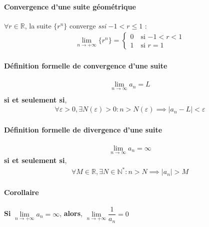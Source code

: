 \documentclass[2pt]{report}
\begin{document}
\begin{multicols*}{3}
        \paragraph{Convergence d'une suite géométrique}
        $\forall r \in \mathbb{R}$, la suite $\{r^n\}$ converge        
        \textit{ssi} $-1 < r \leq 1$ : 
        \begin{align*}
            \lim\limits_{n\to+\infty }\{r^n\} = 
                    \begin{cases}
                        0 \quad \text{si $-1 < r < 1$} \\
                        1 \quad \text{si $r = 1$}
                    \end{cases}
        \end{align*}


        

    \paragraph{Définition formelle de convergence d'une suite}
      \begin{align*}
        \lim\limits_{n \to\infty  }{a_n} = L \\
      \end{align*}
      \textbf{si et seulement si}, 
      \begin{align*}
        \forall\varepsilon > 0, \exists N\left( \varepsilon \right) > 0 : 
        n > N\left( \varepsilon \right) \implies 
        |a_n -L| < \varepsilon
      \end{align*}



    \paragraph{Définition formelle de divergence d'une suite}
      \begin{align*}
        \lim\limits_{n  \to\infty  }{a_n} = \infty
      \end{align*}
      \textbf{si et seulement si},  
        \begin{align*}
            \forall M \in \mathbb{R}, \exists N \in \mathbb{N}^{*} :
            n > N \implies |a_n| > M 
        \end{align*}

    \paragraph{Corollaire}
    \textbf{Si} $\lim\limits_{n\to+\infty }a_n  = \infty$, 
    \textbf{alors}, 
    $\lim\limits_{n\to+\infty }{\dfrac{1}{a_n}}  = 0$





\end{multicols*}
\end{document}
